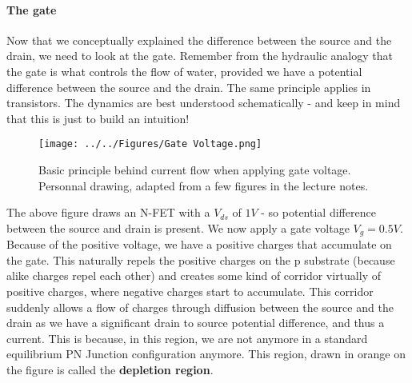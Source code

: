 \paragraph{The gate} Now that we conceptually explained the difference between the source and the drain, we need to look at the gate. Remember from the hydraulic analogy that the gate is what controls the flow of water, provided we have a potential difference between the source and the drain. The same principle applies in transistors. The dynamics are best understood schematically - and keep in mind that this is just to build an intuition!

\begin{figure}[H]
    \centering
    \texttt{[image: ../../Figures/Gate Voltage.png]}
    \caption{Basic principle behind current flow when applying gate voltage. Personnal drawing, adapted from a few figures in the lecture notes.}
    \label{fig:Gate_Voltage}
\end{figure}

The above figure draws an N-FET with a $V_{ds}$ of $1V$ - so potential difference between the source and drain is present. We now apply a gate voltage $V_g = 0.5V$. Because of the positive voltage, we have a positive charges that accumulate on the gate. This naturally repels the positive charges on the p substrate (because alike charges repel each other) and creates some kind of corridor virtually of positive charges, where negative charges start to accumulate. This corridor suddenly allows a flow of charges through diffusion between the source and the drain as we have a significant drain to source potential difference, and thus a current. This is because, in this region, we are not anymore in a standard equilibrium PN Junction configuration anymore. This region, drawn in orange on the figure is called the \textbf{depletion region}. 